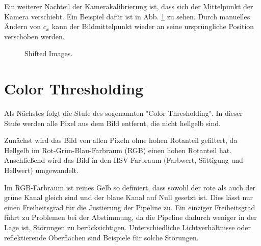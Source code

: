 \documentclass[arbeit=studie,oneside,BCOR=12mm]{ArbeitRST}
\begin{document}
Ein weiterer Nachteil der Kamerakalibrierung ist, dass sich der Mittelpunkt der
Kamera verschiebt. Ein Beispiel dafür ist in Abb. \ref{shifted} zu sehen. Durch
manuelles Ändern von $c_x$ kann der Bildmittelpunkt wieder an seine
ursprüngliche Position verschoben werden. 

\begin{figure}[h]
    \centering
    \caption{Shifted Images.}
    \label{shifted}
\end{figure}

\section{\glqq Color Thresholding\grqq}

Als Nächstes folgt die Stufe des sogenannten "Color Thresholding". In dieser
Stufe werden alle Pixel aus dem Bild entfernt, die nicht hellgelb sind.

Zunächst wird das Bild von allen Pixeln ohne hohen Rotanteil gefiltert, da
Hellgelb im Rot-Grün-Blau-Farbraum (RGB) einen hohen Rotanteil hat.
Anschließend wird das Bild in den HSV-Farbraum (Farbwert, Sättigung und
Hellwert) umgewandelt. 

Im RGB-Farbraum ist reines Gelb so definiert, dass sowohl der rote als auch der
grüne Kanal gleich sind und der blaue Kanal auf Null gesetzt ist. Dies lässt
nur einen Freiheitsgrad für die Justierung der Pipeline zu.  Ein einziger
Freiheitsgrad führt zu Problemen bei der Abstimmung, da die Pipeline dadurch
weniger in der Lage ist, Störungen zu berücksichtigen. Unterschiedliche
Lichtverhältnisse oder reflektierende Oberflächen sind Beispiele für solche
Störungen.
\end{document}
